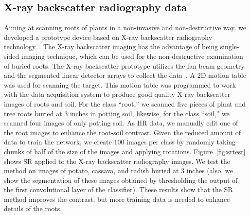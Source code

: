 \documentclass[10pt,twocolumn,letterpaper]{article}
\begin{document}
\subsection{X-ray backscatter radiography data}

Aiming at scanning roots of plants in a non-invasive and non-destructive way, we developed a prototype device based on X-ray backscatter radiography technology~\cite{Kelley2019}. The X-ray backscatter imaging has the advantage of being single-sided imaging technique, which can be used for the non-destructive examination of buried roots. The X-ray backscatter prototype utilizes the fan beam geometry and the segmented linear detector arrays to collect the data~\cite{Cui2017}. A 2D motion table was used for scanning the target. This motion table was programmed to work with the data acquisition system to produce good quality X-ray backscatter images of roots and soil. For the class ``root,'' we scanned five pieces of plant and tree roots buried at 3 inches in potting soil, likewise, for the class ``soil,'' we scanned four images of only potting soil. As HR data, we manually edit one of the root images to enhance the root-soil contrast. Given the reduced amount of data to train the network, we create 100 images per class by randomly taking chunks of half of the size of the images and applying rotations. Figure~\ref{fig:srtest} shows SR applied to the X-ray backscatter radiography images. We test the method on images of potato, cassava, and radish buried at 3 inches (also, we show the segmentation of these images obtained by thresholding the output of the first convolutional layer of the classifier). These results show that the SR method improves the contrast, but more training data is needed to enhance details of the roots.
\end{document}

